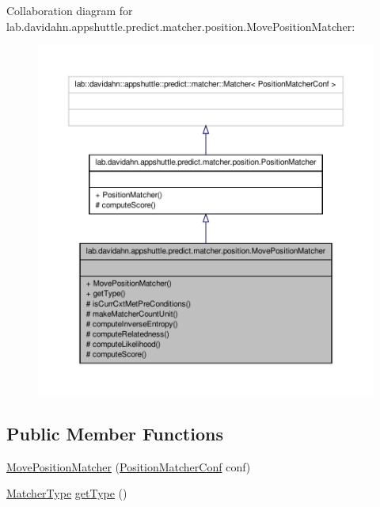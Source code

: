 \-Collaboration diagram for lab.\-davidahn.\-appshuttle.\-predict.\-matcher.\-position.\-Move\-Position\-Matcher\-:
\nopagebreak
\begin{figure}[H]
\begin{center}
\leavevmode
\includegraphics[width=350pt]{classlab_1_1davidahn_1_1appshuttle_1_1predict_1_1matcher_1_1position_1_1_move_position_matcher__coll__graph}
\end{center}
\end{figure}
\subsection*{\-Public \-Member \-Functions}
\begin{DoxyCompactItemize}
\item 
\hyperlink{classlab_1_1davidahn_1_1appshuttle_1_1predict_1_1matcher_1_1position_1_1_move_position_matcher_a6e875e8263991921fdb43658ba955914}{\-Move\-Position\-Matcher} (\hyperlink{classlab_1_1davidahn_1_1appshuttle_1_1predict_1_1matcher_1_1position_1_1_position_matcher_conf}{\-Position\-Matcher\-Conf} conf)
\item 
\hyperlink{enumlab_1_1davidahn_1_1appshuttle_1_1predict_1_1matcher_1_1_matcher_type}{\-Matcher\-Type} \hyperlink{classlab_1_1davidahn_1_1appshuttle_1_1predict_1_1matcher_1_1position_1_1_move_position_matcher_a3d2575e98635d0936c84436ce77f510a}{get\-Type} ()
\end{DoxyCompactItemize}
